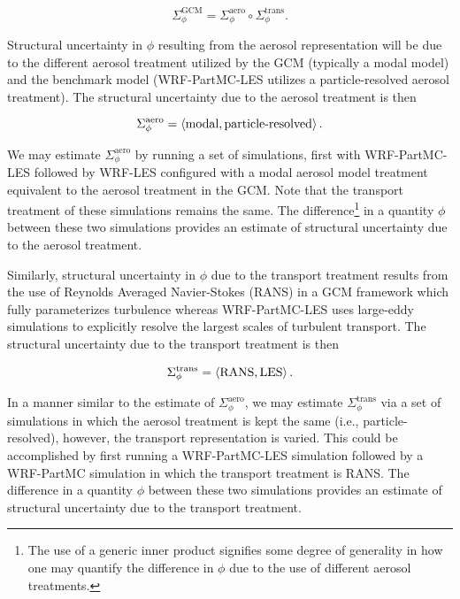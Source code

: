 \begin{equation}
    \Sigma^{\text{GCM}}_{\phi} = \Sigma^{\text{aero}}_{\phi}\circ \Sigma^{\text{trans}}_{\phi}.
\end{equation}

Structural uncertainty in $\phi$ resulting from the aerosol representation will be due to the different aerosol treatment utilized by the GCM (typically a modal model) and the benchmark model (WRF-PartMC-LES utilizes a particle-resolved aerosol treatment). The structural uncertainty due to the aerosol treatment is then

\begin{equation}
    \Sigma^{\text{aero}}_{\phi} = \braket{\text{modal},\text{particle-resolved}}.
\end{equation}


We may estimate $\Sigma^{\text{aero}}_{\phi}$ by running a set of simulations, first with WRF-PartMC-LES followed by WRF-LES configured with a modal aerosol model treatment equivalent to the aerosol treatment in the GCM. Note that the transport treatment of these simulations remains the same. The difference\footnote{The use of a generic inner product signifies some degree of generality in how one may quantify the difference in $\phi$ due to the use of different aerosol treatments.} in a quantity $\phi$ between these two simulations provides an estimate of structural uncertainty due to the aerosol treatment.

Similarly, structural uncertainty in $\phi$ due to the transport treatment results from the use of Reynolds Averaged Navier-Stokes (RANS) in a GCM framework which fully parameterizes turbulence whereas WRF-PartMC-LES uses large-eddy simulations to explicitly resolve the largest scales of turbulent transport. The structural uncertainty due to the transport treatment is then

\begin{equation}
    \Sigma^{\text{trans}}_{\phi} = \braket{\text{RANS},\text{LES}}.
\end{equation}

In a manner similar to the estimate of $\Sigma^{\text{aero}}_{\phi}$, we may estimate $\Sigma^{\text{trans}}_{\phi}$ via a set of simulations in which the aerosol treatment is kept the same (i.e., particle-resolved), however, the transport representation is varied. This could be accomplished by first running a WRF-PartMC-LES simulation followed by a WRF-PartMC simulation in which the transport treatment is RANS. The difference in a quantity $\phi$ between these two simulations provides an estimate of structural uncertainty due to the transport treatment.

